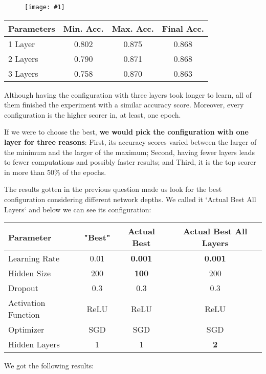 \documentclass[10pt]{article}
\newcommand{\img}[1]{\begin{figure}[H]\centering\texttt{[image: \#1]}\end{figure}}
\begin{document}
\img{tuning/layers.png}
\begin{center}
\begin{tabular}{||l|c|c|c||}
\hline
Parameters & Min. Acc. & Max. Acc. & Final Acc. \\
\hline\hline
1 Layer    & 0.802     & 0.875     & 0.868      \\
\hline
2 Layers   & 0.790     & 0.871     & 0.868      \\
\hline
3 Layers   & 0.758     & 0.870     & 0.863      \\
\hline
\end{tabular}
\end{center}
Although having the configuration with three layers took longer to learn, all of them finished the experiment with a similar accuracy score.
Moreover, every configuration is the higher scorer in, at least, one epoch.

If we were to choose the best, \textbf{we would pick the configuration with one layer for three reasons}:
First, its accuracy scores varied between the larger of the minimum and the larger of the maximum;
Second, having fewer layers leads to fewer computations and possibly faster results; and
Third, it is the top scorer in more than 50\% of the epochs.


The results gotten in the previous question made us look for the best configuration considering different network depths.
We called it `Actual Best All Layers` and below we can see its configuration:
\begin{center}
\begin{tabular}{||l|c|c|c||}
\hline
Parameter           & "Best" & Actual Best & Actual Best All Layers \\\hline
\hline
Learning Rate       & 0.01   & {\bf 0.001}   & {\bf 0.001}              \\
\hline
Hidden Size         & 200    & {\bf 100}     & 200                    \\
\hline
Dropout             & 0.3    & 0.3         & 0.3                    \\
\hline
Activation Function & ReLU   & ReLU        & ReLU                   \\
\hline
Optimizer           & SGD    & SGD         & SGD                    \\
\hline
Hidden Layers       & 1      & 1           & {\bf 2}                  \\
\hline
\end{tabular}
\end{center}
We got the following results:
\end{document}
